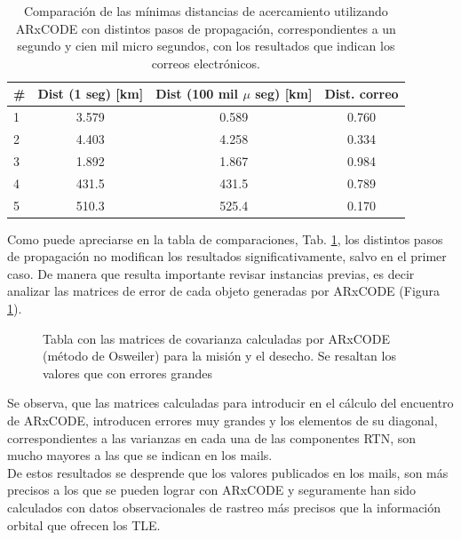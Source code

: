 \begin{table}[!h]
\centering
\begin{tabular}{|l|c|c|c|}
 \hline \hline
  \rowcolor{lightgray}
 \# & Dist (1 seg) [km] & Dist (100 mil $\mu$ seg) [km] & Dist. correo\\
 \hline \hline
 1 & 3.579 &  0.589 &  0.760  \\
 \hline
 2 & 4.403 & 4.258 & 0.334  \\
 \hline
 3 & 1.892 & 1.867 & 0.984 \\
 \hline
 4 & 431.5 & 431.5 & 0.789 \\
 \hline
 5 & 510.3 & 525.4 & 0.170 \\
 \hline
\end{tabular} %
\caption{Comparaci\'on de las m\'inimas distancias de acercamiento utilizando ARxCODE con distintos pasos de propagaci\'on, correspondientes a un segundo y cien mil micro segundos, con los resultados que indican los correos electr\'onicos.}
\label{tab:mailsMinD}
\end{table}

Como puede apreciarse en la tabla de comparaciones, Tab. \ref{tab:mailsMinD}, los distintos pasos de propagaci\'on no modifican los resultados significativamente, salvo en el primer caso. De manera que resulta importante revisar instancias previas, es decir analizar las matrices de error de cada objeto generadas por ARxCODE (Figura \ref{fig:tablaMAmails}).\\

 \begin{figure}[!h]
  \centering
  \caption{Tabla con las matrices de covarianza calculadas por ARxCODE (m\'etodo de Osweiler) para la misi\'on y el desecho. Se resaltan los valores que con errores grandes}
  \label{fig:tablaMAmails}
\end{figure}

Se observa, que las matrices calculadas para introducir en el c\'alculo del encuentro de ARxCODE, introducen errores muy grandes y los elementos de su diagonal, correspondientes a las varianzas en cada una de las componentes RTN, son mucho mayores a las que se indican en los mails.\\
De estos resultados se desprende que los valores publicados en los mails, son m\'as precisos a los que se pueden lograr con ARxCODE y seguramente han sido calculados con datos observacionales de rastreo m\'as precisos que la informaci\'on orbital que ofrecen los TLE. 

